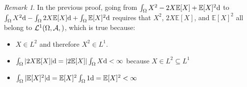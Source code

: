 \documentclass{article}
\theoremstyle{definition}
\theoremstyle{remark}
\newtheorem*{remark}{Remark}
\theoremstyle{example}
\theoremstyle{notation}
\theoremstyle{axiom}
\newcommand{\E}[1]{\mathbb{E}[#1]}
\let\P\relax
\begin{document}
\begin{remark}
		In the previous proof, going from $\int_\Omega X^2 - 2X\E{X} + \E{X}^2 \dd \P$ to $\int_\Omega X^2 \dd \P - \int_\Omega 2X\E{X} \dd \P + \int_\Omega \E{X}^2 \dd \P$ requires that $X^2$, $2X\E{X}$, and $\E{X}^2$ all belong to $\mathcal{L}^1(\Omega, \mathcal{A}, \P)$, which is true because:
		\begin{itemize}
				\item $X \in L^2$ and therefore $X^2 \in L^1$.
				\item $\int_\Omega |2X\E{X}| \dd \P = |2\E{X}|\int_\Omega X \dd \P < \infty$ because $X \in L^2 \subseteq L^1$
				\item $\int_\Omega |\E{X}^2| \dd \P = \E{X}^2 \int_\Omega 1 \dd \P = \E{X}^2 < \infty$
		\end{itemize}
\end{remark}




\end{document}
